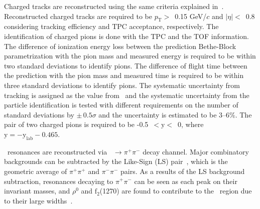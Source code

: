 \documentclass[ALICE,manyauthors]{cernphprep}
\begin{document}
Charged tracks are reconstructed using the same criteria explained in~\cite{ALICE:2013wgn}. Reconstructed charged tracks are required to be $p_{\mathrm{T}}>$~0.15 GeV/$c$ and $|\eta|<$~0.8 considering tracking efficiency and TPC acceptance, respectively. The identification of charged pions is done with the TPC and the TOF information. The difference of ionization energy loss between the prediction Bethe-Block parametrization with the pion mass and measured energy is required to be within two standard deviations to identify pions. The difference of flight time between the prediction with the pion mass and measured time is required to be within three standard deviations to identify pions. The systematic uncertainty from tracking is assigned as the value from~\cite{ALICE:2013wgn} and the systematic uncertainty from the particle identification is tested with different requirements on the number of standard deviations by $\pm\,0.5\sigma$ and the uncertainty is estimated to be 3--6\%. The pair of two charged pions is required to be -0.5~$<\mathrm{y}<$~0, where $\mathrm{y} = -\mathrm{y}_{\mathrm{lab}} -0.465$.

\fzero~resonances are reconstructed via \fzero~$\rightarrow \pi^{+}\pi^{-}$ decay channel. Major combinatory backgrounds can be subtracted by the Like-Sign (LS) pair~\cite{PhysRevD.36.2019}, which is the geometric average of $\pi^{+}\pi^{+}$ and $\pi^{-}\pi^{-}$ pairs. As a results of the LS background subtraction, resonances decaying to $\pi^{+}\pi^{-}$ can be seen as each peak on their invariant masses, and $\rho^{0}$ and $\mathrm{f}_{2}$(1270) are found to contribute to the \fzero~region due to their large widths~\cite{ParticleDataGroup:2020ssz}.
\end{document}
